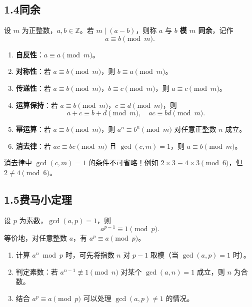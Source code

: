 \documentclass[12pt, a4paper]{ctexart}
\begin{document}
\subsection*{1.4\quad 同余}

\begin{knowledgebox}[同余的定义]
设 $m$ 为正整数，$a, b \in \mathbb{Z}$。若 $m \mid (a - b)$，则称 $a$ 与 $b$ \textbf{模 $m$ 同余}，记作
\[ a \equiv b \pmod{m}. \]
\end{knowledgebox}

\begin{knowledgebox}[同余的基本性质]
\begin{enumerate}[label=(\arabic*)]
  \item \textbf{自反性}：$a \equiv a \pmod{m}$。
  \item \textbf{对称性}：若 $a \equiv b \pmod{m}$，则 $b \equiv a \pmod{m}$。
  \item \textbf{传递性}：若 $a \equiv b \pmod{m}$，$b \equiv c \pmod{m}$，则 $a \equiv c \pmod{m}$。
  \item \textbf{运算保持}：若 $a \equiv b \pmod{m}$，$c \equiv d \pmod{m}$，则
  \[ a+c \equiv b+d \pmod{m}, \quad ac \equiv bd \pmod{m}. \]
  \item \textbf{幂运算}：若 $a \equiv b \pmod{m}$，则 $a^n \equiv b^n \pmod{m}$ 对任意正整数 $n$ 成立。
  \item \textbf{消去律}：若 $ac \equiv bc \pmod{m}$ 且 $\gcd(c, m) = 1$，则 $a \equiv b \pmod{m}$。
\end{enumerate}
\end{knowledgebox}

\begin{warnbox}[易错提醒]
消去律中 $\gcd(c, m) = 1$ 的条件不可省略！例如 $2 \times 3 \equiv 4 \times 3 \pmod{6}$，但 $2 \not\equiv 4 \pmod{6}$。
\end{warnbox}

\subsection*{1.5\quad 费马小定理}

\begin{knowledgebox}[费马小定理]
设 $p$ 为素数，$\gcd(a, p) = 1$，则
\[ a^{p-1} \equiv 1 \pmod{p}. \]
等价地，对任意整数 $a$，有 $a^p \equiv a \pmod{p}$。
\end{knowledgebox}

\begin{tipbox}[应用技巧]
\begin{enumerate}[label=(\arabic*)]
  \item 计算 $a^n \bmod p$ 时，可先将指数 $n$ 对 $p-1$ 取模（当 $\gcd(a, p)=1$ 时）。
  \item 判定素数：若 $a^{n-1} \not\equiv 1 \pmod{n}$ 对某个 $\gcd(a, n)=1$ 成立，则 $n$ 为合数。
  \item 结合 $a^p \equiv a \pmod{p}$ 可以处理 $\gcd(a, p) \neq 1$ 的情况。
\end{enumerate}
\end{tipbox}
\end{document}
